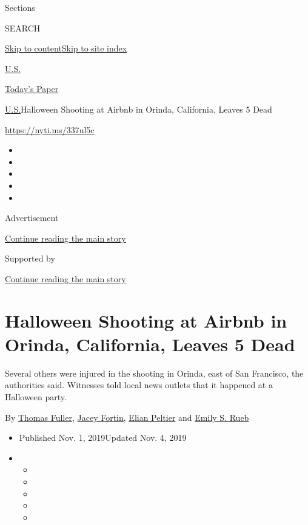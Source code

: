 Sections

SEARCH

\protect\hyperlink{site-content}{Skip to
content}\protect\hyperlink{site-index}{Skip to site index}

\href{https://www.nytimes3xbfgragh.onion/section/us}{U.S.}

\href{https://myaccount.nytimes3xbfgragh.onion/auth/login?response_type=cookie\&client_id=vi}{}

\href{https://www.nytimes3xbfgragh.onion/section/todayspaper}{Today's
Paper}

\href{/section/us}{U.S.}\textbar{}Halloween Shooting at Airbnb in
Orinda, California, Leaves 5 Dead

\url{https://nyti.ms/337ul5c}

\begin{itemize}
\item
\item
\item
\item
\item
\end{itemize}

Advertisement

\protect\hyperlink{after-top}{Continue reading the main story}

Supported by

\protect\hyperlink{after-sponsor}{Continue reading the main story}

\hypertarget{halloween-shooting-at-airbnb-in-orinda-california-leaves-5-dead}{%
\section{Halloween Shooting at Airbnb in Orinda, California, Leaves 5
Dead}\label{halloween-shooting-at-airbnb-in-orinda-california-leaves-5-dead}}

Several others were injured in the shooting in Orinda, east of San
Francisco, the authorities said. Witnesses told local news outlets that
it happened at a Halloween party.

By \href{https://www.nytimes3xbfgragh.onion/by/thomas-fuller}{Thomas
Fuller}, \href{https://www.nytimes3xbfgragh.onion/by/jacey-fortin}{Jacey
Fortin},
\href{https://www.nytimes3xbfgragh.onion/by/elian-peltier}{Elian
Peltier} and
\href{https://www.nytimes3xbfgragh.onion/by/emily-s-rueb}{Emily S. Rueb}

\begin{itemize}
\item
  Published Nov. 1, 2019Updated Nov. 4, 2019
\item
  \begin{itemize}
  \item
  \item
  \item
  \item
  \item
  \end{itemize}
\end{itemize}

